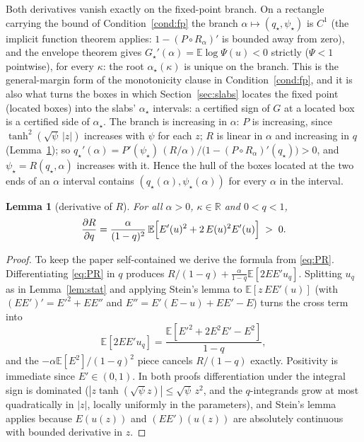 \documentclass[11pt]{article}
\newtheorem{lemma}[theorem]{Lemma}
\theoremstyle{remark}
\newcommand{\E}{\mathbb{E}}
\newcommand{\R}{\mathbb{R}}
\begin{document}
Both derivatives vanish exactly on the fixed-point branch.  On a
rectangle carrying the bound of Condition~\ref{cond:fp} the
branch $\alpha\mapsto(q_\star,\psi_\star)$ is $C^1$ (the implicit
function theorem applies: $1-(P\circ R_\alpha)'$ is bounded away
from zero), and the envelope theorem gives
$G_\star'(\alpha)=\E\log\Psi(u)<0$ strictly ($\Psi<1$ pointwise), for
every $\kappa$: the root $\alpha_\star(\kappa)$ is unique on the
branch.  This is the
general-margin form of the monotonicity clause in
Condition~\ref{cond:fp}, and it is also what turns the boxes in which
Section~\ref{sec:slabs} locates the fixed point (located boxes) into the slabs'
$\alpha_\star$ intervals: a certified sign of $G$ at a located box is
a certified side of $\alpha_\star$.  The branch is increasing in
$\alpha$: $P$ is increasing, since $\tanh^2(\sqrt\psi\,|z|)$ increases
with $\psi$ for each $z$; $R$ is linear in $\alpha$ and increasing in
$q$ (Lemma~\ref{lem:dR}); so
$q_\star'(\alpha)=P'(\psi_\star)\,(R/\alpha)\big/\bigl(1-(P\circ
R_\alpha)'(q_\star)\bigr)>0$, and $\psi_\star=R(q_\star,\alpha)$
increases with it.  Hence the hull of the boxes located at the two
ends of an $\alpha$ interval contains $(q_\star(\alpha),\psi_\star(\alpha))$
for every $\alpha$ in the interval.

\begin{lemma}[derivative of $R$]\label{lem:dR}
For all $\alpha>0$, $\kappa\in\R$ and $0<q<1$,
\[
\frac{\partial R}{\partial q}
=\frac{\alpha}{(1-q)^2}\,
\E\Bigl[E'(u)^2+2\,E(u)^2E'(u)\Bigr]\;>\;0 .
\]
\end{lemma}

\begin{proof}
To keep the paper self-contained we derive the formula from \eqref{eq:PR}.
Differentiating \eqref{eq:PR} in $q$ produces
$R/(1-q)+\tfrac{\alpha}{1-q}\E[2EE'u_q]$.  Splitting $u_q$ as in
Lemma~\ref{lem:stat} and applying Stein's lemma to
$\E[z\,EE'(u)]$ (with $(EE')'=E'^2+EE''$ and
$E''=E'(E-u)+EE'-E$) turns the cross term into
\[
\E[2EE'u_q]=\frac{\E[E'^2+2E^2E'-E^2]}{1-q},
\]
and the $-\alpha\E[E^2]/(1-q)^2$ piece cancels $R/(1-q)$ exactly.
Positivity is immediate since $E'\in(0,1)$.  In both proofs
differentiation under the integral sign is dominated
($|z\tanh(\sqrt\psi z)|\le\sqrt\psi\,z^2$, and the $q$-integrands
grow at most quadratically in $|z|$, locally uniformly in the
parameters), and Stein's lemma applies because $E(u(z))$ and
$(EE')(u(z))$ are absolutely continuous with bounded derivative in
$z$.
\end{proof}
\end{document}
